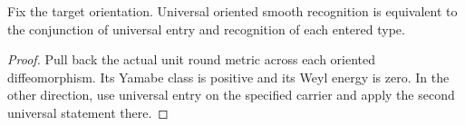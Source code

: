 \begin{proposition}
\label{prop:ed52-logical}
\leanok
Fix the target orientation. Universal oriented smooth recognition is
equivalent to the conjunction of universal entry and recognition of
each entered type.
\end{proposition}
\begin{proof}
\leanok
Pull back the actual unit round metric across each oriented
diffeomorphism. Its Yamabe class is positive and its Weyl energy is zero.
In the other direction, use universal entry on the specified carrier
and apply the second universal statement there.
\end{proof}
